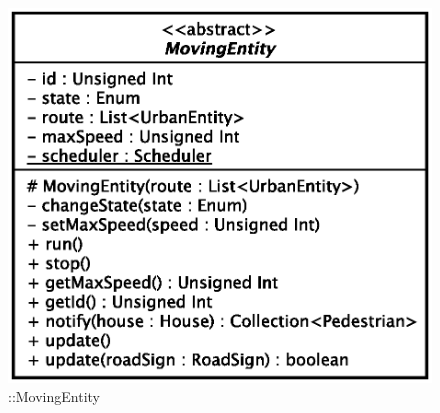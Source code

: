 \begin{figure}[h]
\centering
\includegraphics[scale=0.6,keepaspectratio]{images/solution/app/backend/moving_entity.eps}
\caption{\pActive::MovingEntity}
\label{fig:sd-app-movingentity}
\end{figure}
\FloatBarrier
